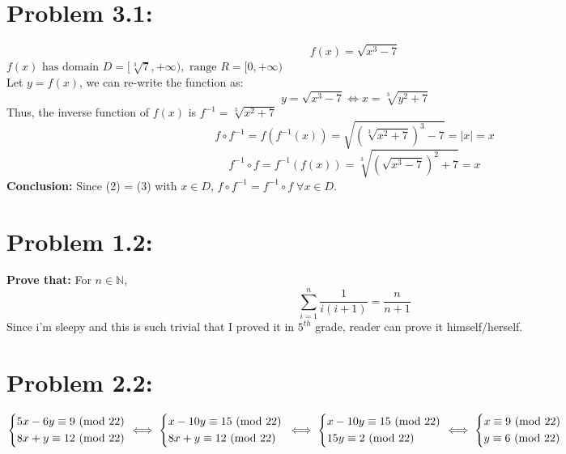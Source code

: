 \documentclass{article}
\newcommand{\N}{\mathbb{N}}
\begin{document}
	\section{Problem 3.1:}
		\begin{equation*}
			f(x) = \sqrt{x^3-7}
		\end{equation*}
		$f(x) \mbox{ has domain }D = [\sqrt[3]{7}, +\infty), \mbox{ range } R = [0, +\infty)$\\
		Let $y = f(x)$, we can re-write the function as:
		\begin{equation*}
			y = \sqrt{x^3-7} \iff x = \sqrt[3]{y^2 + 7}
		\end{equation*}
		Thus, the inverse function of $f(x)$ is $f^{-1} = \sqrt[3]{x^2 + 7}$\\
		\begin{equation}
			f \circ f^{-1} = f(f^{-1}(x)) = \sqrt{(\sqrt[3]{x^2+7})^3-7} = |x| = x
		\end{equation}
		\begin{equation}
				f^{-1} \circ f = f^{-1}(f(x)) = \sqrt[3]{(\sqrt{x^3-7})^2 + 7} = x
		\end{equation}
		\textbf{Conclusion:} Since (2) = (3) with $x \in D$, $f \circ f^{-1} = f^{-1} \circ f \; \forall x \in D$.
		
	\section{Problem 1.2:}
		\textbf{Prove that:} For $n \in \N$,
		\begin{equation*}
						\sum_{i=1}^{n} \frac{1}{i(i+1)} = \frac{n}{n+1}
		\end{equation*}
		Since i'm sleepy and this is such trivial that I proved it in $5^{th}$ grade, reader can prove it himself/herself.
	
	\section{Problem 2.2:}
		\begin{math}
			\begin{cases*}
				5x - 6y \equiv 9 \mbox{ (mod 22)}\\
				8x + y \equiv 12 \mbox{ (mod 22)}
			\end{cases*}
			\iff
			\begin{cases*}
				x - 10y \equiv 15 \mbox{ (mod 22)}\\
				8x + y \equiv 12 \mbox{ (mod 22)}
			\end{cases*}
			\\\\\\
			\iff
			\begin{cases*}
				x - 10y \equiv 15 \mbox{ (mod 22)}\\
				15y \equiv 2 \mbox{ (mod 22)}
			\end{cases*}
			\iff
			\begin{cases*}
				x \equiv 9 \mbox{ (mod 22)}\\
				y \equiv 6 \mbox{ (mod 22)}
			\end{cases*}
		\end{math}
		
\end{document}

